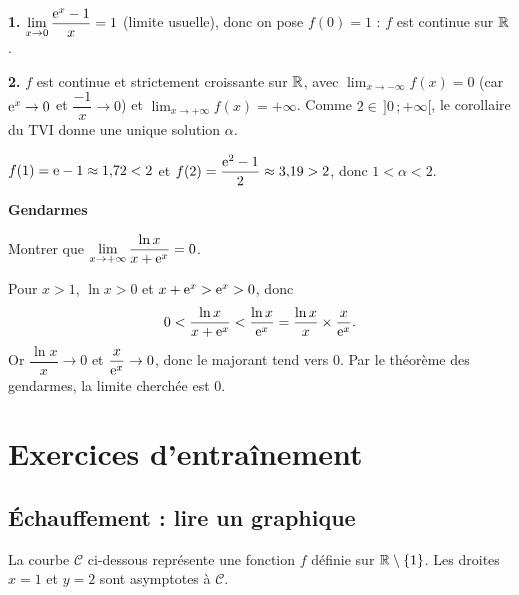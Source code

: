 \solution

\textbf{1.} $\displaystyle\lim_{x\to 0}\frac{\mathrm{e}^x-1}{x}=1$ (limite usuelle),
donc on pose $f(0)=1$ : $f$ est continue sur $\mathbb{R}$.

\textbf{2.} $f$ est continue et strictement croissante sur $\mathbb{R}$, avec
$\displaystyle\lim_{x\to-\infty}f(x)=0$ (car $\mathrm{e}^x\to 0$ et
$\dfrac{-1}{x}\to 0$) et $\displaystyle\lim_{x\to+\infty}f(x)=+\infty$.
Comme $2\in\,]0\,;+\infty[$, le corollaire du TVI donne une unique solution
$\alpha$.

$f(1)=\mathrm{e}-1\approx 1{,}72<2$ et
$f(2)=\dfrac{\mathrm{e}^2-1}{2}\approx 3{,}19>2$, donc $1<\alpha<2$.

\bigskip
\exerciceresolu
\textbf{Gendarmes}

Montrer que $\displaystyle\lim_{x\to+\infty}\frac{\ln x}{x+\mathrm{e}^x}=0$.

\solution

Pour $x>1$, $\ln x>0$ et $x+\mathrm{e}^x>\mathrm{e}^x>0$, donc
\[
0<\frac{\ln x}{x+\mathrm{e}^x}<\frac{\ln x}{\mathrm{e}^x}
=\frac{\ln x}{x}\times\frac{x}{\mathrm{e}^x}.
\]
Or $\dfrac{\ln x}{x}\to 0$ et $\dfrac{x}{\mathrm{e}^x}\to 0$, donc le majorant tend
vers $0$. Par le théorème des gendarmes, la limite cherchée est $0$.


\section{Exercices d'entraînement}

\subsection{Échauffement : lire un graphique}

La courbe $\mathcal C$ ci-dessous représente une fonction $f$ définie sur
$\mathbb{R}\setminus\{1\}$. Les droites $x=1$ et $y=2$ sont asymptotes à $\mathcal C$.

\begin{center}
\end{center}

